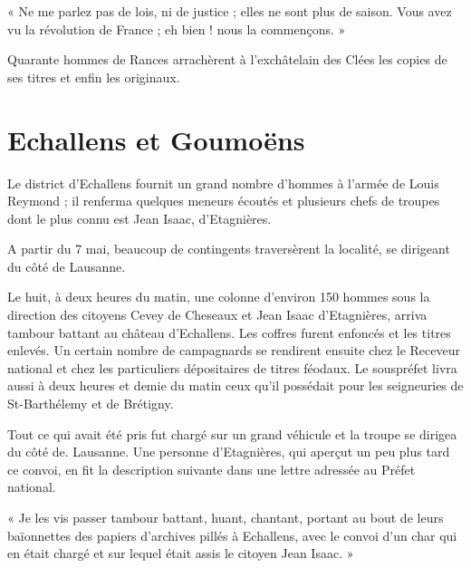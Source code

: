 \documentclass[french,twoside]{book} %
\newenvironment{quoteblock}%
  {\begin{quoting}}
  {\end{quoting}}
\newenvironment{quotebar}{%
    \def\FrameCommand{{\color{rubric!10!}\vrule width 0.5em} \hspace{0.9em}}%
    \def\OuterFrameSep{\itemsep} %
    \MakeFramed {\advance\hsize-\width \FrameRestore}
  }%
  {%
    \endMakeFramed
  }
\renewenvironment{quoteblock}%
  {%
    \savenotes
    \setstretch{0.9}
    \begin{quotebar}
  }
  {%
    \end{quotebar}
    \spewnotes
  }
\begin{document}
\begin{quoteblock}
 \noindent « Ne me parlez pas de lois, ni de justice ; elles ne sont plus de saison. Vous avez vu la révolution de France ; eh bien ! nous la commençons. »
 \end{quoteblock}

\noindent Quarante hommes de Rances arrachèrent à l’exchâtelain des Clées les copies de ses titres et enfin les originaux.
\section[Echallens et Goumoëns]{Echallens et Goumoëns}
\noindent Le district d’Echallens fournit un grand nombre d’hommes à l’armée de Louis Reymond ; il renferma quelques meneurs écoutés et plusieurs chefs de troupes dont le plus connu est Jean Isaac, d’Etagnières.\par
A partir du 7 mai, beaucoup de contingents traversèrent la localité, se dirigeant du côté de Lausanne.\par
Le huit, à deux heures du matin, une colonne d’environ 150 hommes sous la direction des citoyens Cevey de Cheseaux et Jean Isaac d’Etagnières, arriva tambour battant au château d’Echallens. Les coffres furent enfoncés et les titres enlevés. Un certain nombre de campagnards se rendirent ensuite chez le Receveur national et chez les particuliers dépositaires de titres féodaux. Le souspréfet livra aussi à deux heures et demie du matin ceux qu’il possédait pour les seigneuries de St-Barthélemy et de Brétigny.\par
Tout ce qui avait été pris fut chargé sur un grand véhicule et la troupe se dirigea du côté de. Lausanne. Une personne d’Etagnières, qui aperçut un peu plus tard ce convoi, en fit la description suivante dans une lettre adressée au Préfet national.\par

\begin{quoteblock}
 \noindent « Je les vis passer tambour battant, huant, chantant, portant au bout de leurs baïonnettes des papiers d’archives pillés à Echallens, avec le convoi d’un char qui en était chargé et sur lequel était assis le citoyen Jean Isaac. »
 \end{quoteblock}
\end{document}
